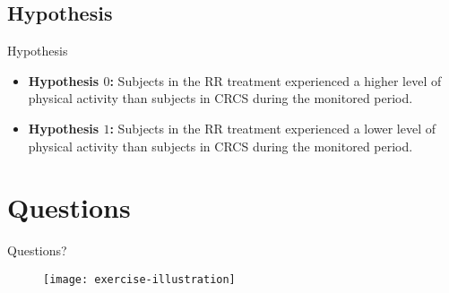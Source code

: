 \documentclass{beamer}
\begin{document}
\subsection{Hypothesis}
\begin{frame}{Hypothesis}
  	\begin{itemize} 
  		\item \textbf{Hypothesis $0$:} Subjects in the RR treatment experienced a higher level of physical activity than subjects in CRCS during the monitored period.
  		\item\textbf{Hypothesis $1$:} Subjects in the RR treatment experienced a lower level of physical activity than subjects in CRCS during the monitored period.
  	\end{itemize}
  \end{frame}
  \section{Questions}
  \begin{frame}{Questions?}
  	\begin{figure}
\centering
\texttt{[image: exercise-illustration]}
\caption{}
\label{fig:exercise-illustration}
\end{figure}
  \end{frame}
\end{document}
